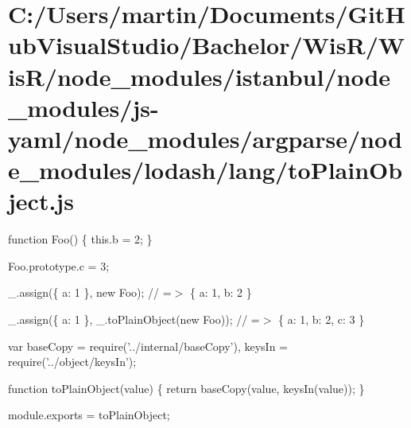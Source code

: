 \hypertarget{_c_1_2_users_2martin_2_documents_2_git_hub_visual_studio_2_bachelor_2_wis_r_2_wis_r_2node_modulee0df8010fa822c862753ec364e7809e3}{}\section{C\+:/\+Users/martin/\+Documents/\+Git\+Hub\+Visual\+Studio/\+Bachelor/\+Wis\+R/\+Wis\+R/node\+\_\+modules/istanbul/node\+\_\+modules/js-\/yaml/node\+\_\+modules/argparse/node\+\_\+modules/lodash/lang/to\+Plain\+Object.\+js}
function Foo() \{ this.\+b = 2; \}

Foo.\+prototype.\+c = 3;

\+\_\+.\+assign(\{ \textquotesingle{}a\textquotesingle{}\+: 1 \}, new Foo); // =$>$ \{ \textquotesingle{}a\textquotesingle{}\+: 1, \textquotesingle{}b\textquotesingle{}\+: 2 \}

\+\_\+.\+assign(\{ \textquotesingle{}a\textquotesingle{}\+: 1 \}, \+\_\+.\+to\+Plain\+Object(new Foo)); // =$>$ \{ \textquotesingle{}a\textquotesingle{}\+: 1, \textquotesingle{}b\textquotesingle{}\+: 2, \textquotesingle{}c\textquotesingle{}\+: 3 \}


\begin{DoxyCodeInclude}
var baseCopy = require(\textcolor{stringliteral}{'../internal/baseCopy'}),
    keysIn = require(\textcolor{stringliteral}{'../object/keysIn'});

\textcolor{keyword}{function} toPlainObject(value) \{
  \textcolor{keywordflow}{return} baseCopy(value, keysIn(value));
\}

module.exports = toPlainObject;
\end{DoxyCodeInclude}
 